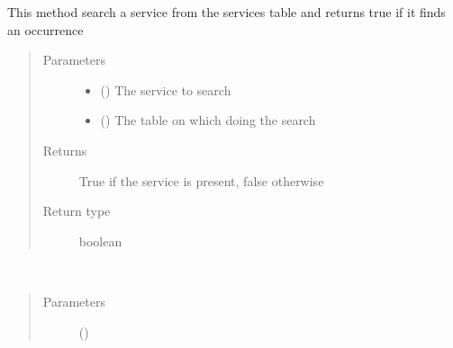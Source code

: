 \documentclass[a4paper,10pt,english,openany,oneside]{sphinxmanual}
\begin{document}
\begin{fulllineitems}
\begin{fulllineitems}
\begin{quote}
\begin{description}
\end{description}\end{quote}

\end{fulllineitems}


\begin{fulllineitems}
\label{\detokenize{code:Share.is_present}}
This method search a service from the services table and returns true if it finds an occurrence
\begin{quote}\begin{description}
\item[{Parameters}] \leavevmode\begin{itemize}
\item {} 
 ({\hyperref[\detokenize{code:Service}]{}}) \textendash{} The service to search

\item {} 
 () \textendash{} The table on which doing the search

\end{itemize}

\item[{Returns}] \leavevmode
True if the service is present, false otherwise

\item[{Return type}] \leavevmode
boolean

\end{description}\end{quote}

\end{fulllineitems}


\begin{fulllineitems}
\label{\detokenize{code:Share.discovery}}~\begin{quote}\begin{description}
\item[{Parameters}] \leavevmode
{} () \textendash{} 


\end{description}
\end{quote}
\end{fulllineitems}
\end{fulllineitems}
\end{document}
